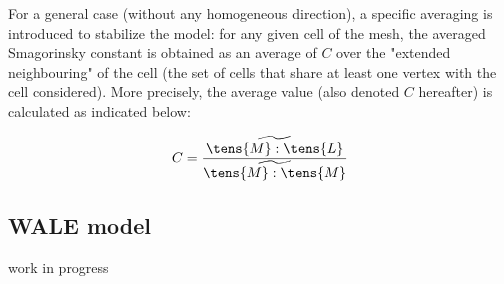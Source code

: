 For a general case (without any homogeneous direction), a specific averaging
is introduced to stabilize the model: for any given cell of the mesh, the
averaged Smagorinsky constant is obtained as an average of $C$ over the
"extended neighbouring" of the cell (the set of cells that share at least
one vertex with the cell considered). More precisely, the average value
(also denoted $C$ hereafter) is calculated as indicated below:

\begin{equation}
C = \frac{\widetilde{ \tens{M} : \tens{L}}} {\widetilde{ \tens{M} : \tens{M}}}
\end{equation}


\subsection{WALE model}
work in progress

